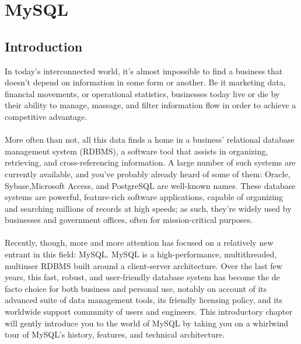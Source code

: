 
\section{MySQL}
\subsection{Introduction}
In today's interconnected world, it's almost impossible to find a business that
doesn’t depend on information in some form or another. Be it marketing data,
financial movements, or operational statistics, businesses today live or die by
their ability to manage, massage, and filter information flow in order to achieve
a competitive advantage.
\\\\
More often than not, all this data finds a home in a business’ relational
database management system (RDBMS), a software tool that assists in organizing,
retrieving, and cross-referencing information. A large number of such systems are
currently available, and you’ve probably already heard of some of them: Oracle,
Sybase,Microsoft Access, and PostgreSQL are well-known names. These database
systems are powerful, feature-rich software applications, capable of organizing
and searching millions of records at high speeds; as such, they’re widely used by
businesses and government offices, often for mission-critical purposes.
\\\\
Recently, though, more and more attention has focused on a relatively new entrant
in this field: MySQL. MySQL is a high-performance, multithreaded, multiuser RDBMS
built around a client-server architecture. Over the last few years, this fast,
robust, and user-friendly database system has become the de facto choice for both
business and personal use, notably on account of its advanced suite of data
management tools, its friendly licensing policy, and its worldwide support
community of users and engineers. This introductory chapter will gently introduce
you to the world of MySQL by taking you on a whirlwind tour of MySQL’s history,
features, and technical architecture.


